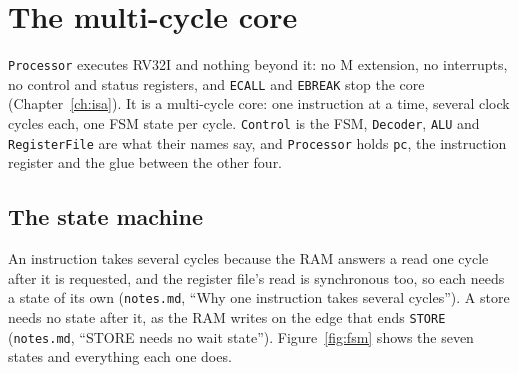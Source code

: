 \documentclass[11pt,a4paper]{report}
\newcommand{\notes}[1]{(\texttt{notes.md}, ``#1'')}
\begin{document}
\chapter{The multi-cycle core}
\label{ch:core}

\texttt{Processor} executes RV32I and nothing beyond it: no M extension, no interrupts, no
control and status registers, and \texttt{ECALL} and \texttt{EBREAK} stop the core
(Chapter~\ref{ch:isa}). It is a multi-cycle core: one instruction at a time, several clock
cycles each, one FSM state per cycle. \texttt{Control} is the FSM, \texttt{Decoder},
\texttt{ALU} and \texttt{RegisterFile} are what their names say, and \texttt{Processor} holds
\texttt{pc}, the instruction register and the glue between the other four.

\section{The state machine}

An instruction takes several cycles because the RAM answers a read one cycle after it is
requested, and the register file's read is synchronous too, so each needs a state of its
own \notes{Why one instruction takes several cycles}. A store needs no state after it, as the
RAM writes on the edge that ends \texttt{STORE} \notes{STORE needs no wait state}.
Figure~\ref{fig:fsm} shows the seven states and everything each one does.
\end{document}
